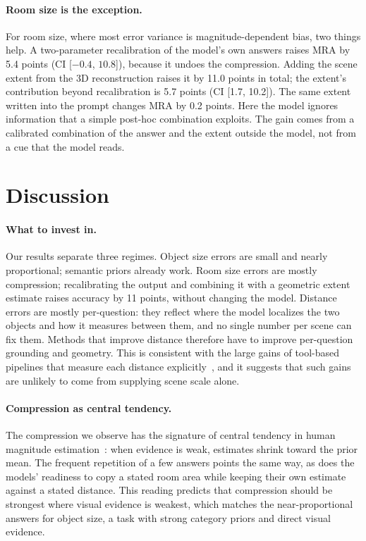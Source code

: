 \documentclass[letterpaper]{article} %
\begin{document}
\paragraph{Room size is the exception.}
For room size, where most error variance is magnitude-dependent bias, two things help. A two-parameter recalibration of the model's own answers raises MRA by 5.4 points (CI [$-0.4$, $10.8$]), because it undoes the compression. Adding the scene extent from the 3D reconstruction raises it by 11.0 points in total; the extent's contribution beyond recalibration is 5.7 points (CI [1.7, 10.2]). The same extent written into the prompt changes MRA by 0.2 points. Here the model ignores information that a simple post-hoc combination exploits. The gain comes from a calibrated combination of the answer and the extent outside the model, not from a cue that the model reads.

\section{Discussion}

\paragraph{What to invest in.}
Our results separate three regimes. Object size errors are small and nearly proportional; semantic priors already work. Room size errors are mostly compression; recalibrating the output and combining it with a geometric extent estimate raises accuracy by 11 points, without changing the model. Distance errors are mostly per-question: they reflect where the model localizes the two objects and how it measures between them, and no single number per scene can fix them. Methods that improve distance therefore have to improve per-question grounding and geometry. This is consistent with the large gains of tool-based pipelines that measure each distance explicitly~\citep{glantz2026seeing}, and it suggests that such gains are unlikely to come from supplying scene scale alone.

\paragraph{Compression as central tendency.}
The compression we observe has the signature of central tendency in human magnitude estimation~\citep{hollingworth1910central,jazayeri2010temporal}: when evidence is weak, estimates shrink toward the prior mean. The frequent repetition of a few answers points the same way, as does the models' readiness to copy a stated room area while keeping their own estimate against a stated distance. This reading predicts that compression should be strongest where visual evidence is weakest, which matches the near-proportional answers for object size, a task with strong category priors and direct visual evidence.
\end{document}
